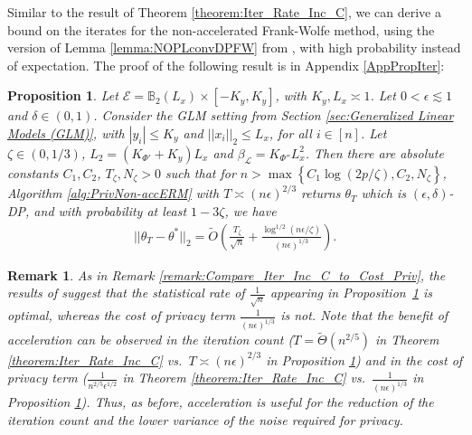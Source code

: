 \documentclass{article}
\newtheorem{prop}{Proposition}
\newtheorem{remark}{\textbf{Remark}}
\begin{document}
Similar to the result of Theorem \ref{theorem:Iter_Rate_Inc_C}, we can derive a bound on the iterates for the non-accelerated Frank-Wolfe method, using the version of Lemma \ref{lemma:NOPLconvDPFW} from \cite{NOPL}, with high probability instead of expectation. The proof of the following result is in Appendix \ref{AppPropIter}:

\begin{prop}
\label{prop:Iter_Rate_Inc_C_Non}
Let $\mathcal{E} = \mathbb{B}_2(L_x)\times [-K_y, K_y]$, with $K_y, L_x \asymp 1$. Let $0 < \epsilon \lesssim 1$ and $\delta \in (0, 1)$. Consider the GLM setting from Section \ref{sec:Generalized Linear Models (GLM)}, with $|y_i| \leq K_y$ and $||x_i||_2 \leq L_x$, for all $i \in [n]$. Let $\zeta \in (0, 1/3)$, $L_2 = (K_{\Phi'} + K_y)L_x$ and $\beta_{\mathcal{L}} = K_{\Phi''}L_x^2$. Then there are absolute constants $C_1, C_2$, $T_\zeta, N_\zeta > 0$ such that for $n > \max\left\{C_1\log(2p/\zeta), C_2, N_\zeta\right\}$, Algorithm \ref{alg:PrivNon-accERM} with $T \asymp (n\epsilon)^{2/3}$ returns $\theta_T$ which is $(\epsilon, \delta)$-DP, and with probability at least $1 - 3\zeta$, we have 
\begin{align*}
||\theta_T - \theta^*||_2 = \widetilde{O}\left(\frac{T_\zeta}{\sqrt{n}} + \frac{\log^{1/2}(n\epsilon/\zeta)}{(n\epsilon)^{1/3}}\right).
\end{align*}
\end{prop}

\begin{remark}
As in Remark \ref{remark:Compare_Iter_Inc_C_to_Cost_Priv}, the results of \cite{Cai_Cost_GLM} suggest that the statistical rate of $\frac{1}{\sqrt{n}}$ appearing in Proposition~\ref{prop:Iter_Rate_Inc_C_Non} is optimal, whereas the cost of privacy term $\frac{1}{(n\epsilon)^{1/3}}$ is not. Note that the benefit of acceleration can be observed in the iteration count ($T = \widetilde{\Theta}\left(n^{2/5}\right)$ in Theorem \ref{theorem:Iter_Rate_Inc_C} vs.\ $T \asymp (n\epsilon)^{2/3}$ in Proposition \ref{prop:Iter_Rate_Inc_C_Non}) and in the cost of privacy term ($\frac{1}{n^{2/5}\epsilon^{1/2}}$ in Theorem \ref{theorem:Iter_Rate_Inc_C} vs.\ $\frac{1}{(n\epsilon)^{1/3}}$ in Proposition \ref{prop:Iter_Rate_Inc_C_Non}). Thus, as before, acceleration is useful for the reduction of the iteration count and the lower variance of the noise required for privacy.
\end{remark}
\end{document}
